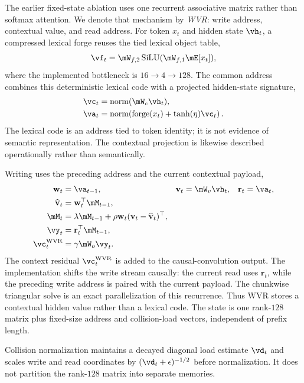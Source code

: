 The earlier fixed-state ablation uses one recurrent associative matrix rather than softmax attention. We denote that mechanism by \emph{WVR}: write address, contextual value, and read address. For token $x_t$ and hidden state $\vh_t$, a compressed lexical forge reuses the tied lexical object table,
\begin{equation}
    \vf_t=\mW_{f,2}\operatorname{SiLU}(\mW_{f,1}\mE[x_t]),
\end{equation}
where the implemented bottleneck is $16\rightarrow4\rightarrow128$. The common address combines this deterministic lexical code with a projected hidden-state signature,
\begin{align}
    \vc_t &= \operatorname{norm}(\mW_c\vh_t),\\
    \va_t &= \operatorname{norm}\!\left(\operatorname{forge}(x_t)+
        \tanh(\eta)\vc_t\right).
\end{align}
The lexical code is an address tied to token identity; it is not evidence of semantic representation. The contextual projection is likewise described operationally rather than semantically.

Writing uses the preceding address and the current contextual payload,
\begin{align}
    \mathbf{w}_t &= \va_{t-1}, & \mathbf{v}_t &= \mW_v\vh_t, & \mathbf{r}_t &= \va_t,\\
    \widehat{\mathbf{v}}_t &= \mathbf{w}_t^\top\mM_{t-1},\\
    \mM_t &= \lambda\mM_{t-1}+\rho\mathbf{w}_t
        (\mathbf{v}_t-\widehat{\mathbf{v}}_t)^\top,\\
    \vy_t &= \mathbf{r}_t^\top\mM_{t-1},\\
    \vc^{\mathrm{WVR}}_t &= \gamma\mW_o\vy_t.
\end{align}
The context residual $\vc^{\mathrm{WVR}}_t$ is added to the causal-convolution output. The implementation shifts the write stream causally: the current read uses $\mathbf{r}_t$, while the preceding write address is paired with the current payload. The chunkwise triangular solve is an exact parallelization of this recurrence. Thus WVR stores a contextual hidden value rather than a lexical code. The state is one rank-$128$ matrix plus fixed-size address and collision-load vectors, independent of prefix length.

Collision normalization maintains a decayed diagonal load estimate $\vd_t$ and scales write and read coordinates by $(\vd_t+\epsilon)^{-1/2}$ before normalization. It does not partition the rank-$128$ matrix into separate memories.

